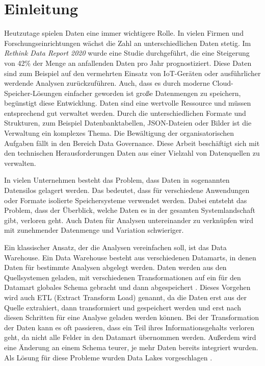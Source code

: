 \chapter{Einleitung}

Heutzutage spielen Daten eine immer wichtigere Rolle.
In vielen Firmen und Forschungseinrichtungen wächst die Zahl an unterschiedlichen Daten stetig.
Im \textit{Rethink Data Report 2020} \textcite{rethink_data_2020} wurde eine Studie durchgeführt, die eine Steigerung von 42\% der Menge an anfallenden Daten pro Jahr prognostiziert.
Diese Daten sind zum Beispiel auf den vermehrten Einsatz von IoT-Geräten oder ausführlicher werdende Analysen zurückzuführen.
Auch, dass es durch moderne Cloud-Speicher-Lösungen einfacher geworden ist große Datenmengen zu speichern, begünstigt diese Entwicklung.
Daten sind eine wertvolle Ressource und müssen entsprechend gut verwaltet werden.
Durch die unterschiedlichen Formate und Strukturen, zum Beispiel Datenbanktabellen, JSON-Dateien oder Bilder ist die Verwaltung ein komplexes Thema.
Die Bewältigung der organisatorischen Aufgaben fällt in den Bereich Data Governance.
Diese Arbeit beschäftigt sich mit den technischen Herausforderungen Daten aus einer Vielzahl von Datenquellen zu verwalten.

In vielen Unternehmen besteht das Problem, dass Daten in sogenannten Datensilos gelagert werden.
Das bedeutet, dass für verschiedene Anwendungen oder Formate isolierte Speichersysteme verwendet werden.
Dabei entsteht das Problem, dass der Überblick, welche Daten es in der gesamten Systemlandschaft gibt, verloren geht.
Auch Daten für Analysen untereinander zu verknüpfen wird mit zunehmender Datenmenge und Variation schwieriger.

Ein klassischer Ansatz, der die Analysen vereinfachen soll, ist das Data Warehouse.
Ein Data Warehouse besteht aus verschiedenen Datamarts, in denen Daten für bestimmte Analysen abgelegt werden.
Daten werden aus den Quellsystemen geladen, mit verschiedenen Transformationen auf ein für den Datamart globales Schema gebracht und dann abgespeichert \parencite{dw}.
Dieses Vorgehen wird auch ETL (Extract Transform Load) genannt, da die Daten erst aus der Quelle extrahiert, dann transformiert und gespeichert werden und erst nach diesen Schritten für eine Analyse geladen werden können.
Bei der Transformation der Daten kann es oft passieren, dass ein Teil ihres Informationsgehalts verloren geht, da nicht alle Felder in den Datamart übernommen werden.
Außerdem wird eine Änderung an einem Schema teurer, je mehr Daten bereits integriert wurden.
Als Lösung für diese Probleme wurden Data Lakes vorgeschlagen \parencite{dixon2010pentaho,datalake_03}.

